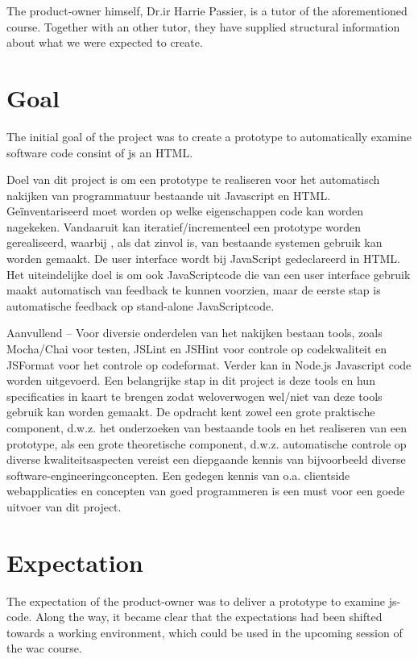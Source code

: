 The product-owner himself, Dr.ir Harrie Passier, is a tutor of the aforementioned course.
Together with an other tutor, they have supplied structural information about
what we were expected to create.


\section{Goal}
The initial goal of the project was to create a prototype to automatically examine
software code consint of \gls{js} an HTML.

Doel van dit project is om een prototype te realiseren voor het automatisch nakijken van programmatuur bestaande uit Javascript en HTML. Geïnventariseerd moet worden op welke eigenschappen code kan worden nagekeken. Vandaaruit kan iteratief/incrementeel een prototype worden gerealiseerd, waarbij , als dat zinvol is, van bestaande systemen gebruik kan worden gemaakt.
De user interface wordt bij JavaScript gedeclareerd in HTML. Het uiteindelijke doel is om ook JavaScriptcode die van een user interface gebruik maakt automatisch van feedback te kunnen voorzien, maar de eerste stap is automatische feedback op stand-alone JavaScriptcode.

Aanvullend – Voor diversie onderdelen van het nakijken bestaan tools, zoals Mocha/Chai voor testen, JSLint en JSHint voor controle op codekwaliteit en JSFormat voor het controle op codeformat. Verder kan in Node.js Javascript code worden uitgevoerd. Een belangrijke stap in dit project is deze tools en hun specificaties in kaart te brengen zodat weloverwogen wel/niet van deze tools gebruik kan worden gemaakt.
De opdracht kent zowel een grote praktische component, d.w.z. het onderzoeken van bestaande tools en het realiseren van een prototype, als een grote theoretische component, d.w.z. automatische controle op diverse kwaliteitsaspecten vereist een diepgaande kennis van bijvoorbeeld diverse software-engineeringconcepten.
Een gedegen kennis van o.a. clientside webapplicaties en concepten van goed programmeren is een must voor een goede uitvoer van dit project.

\section{Expectation}

The expectation of the product-owner was to deliver a prototype to examine \gls{js-code}.
Along the way, it became clear that the expectations had been shifted towards a working environment, which could be used in the upcoming session of the \gls{wac} course.

